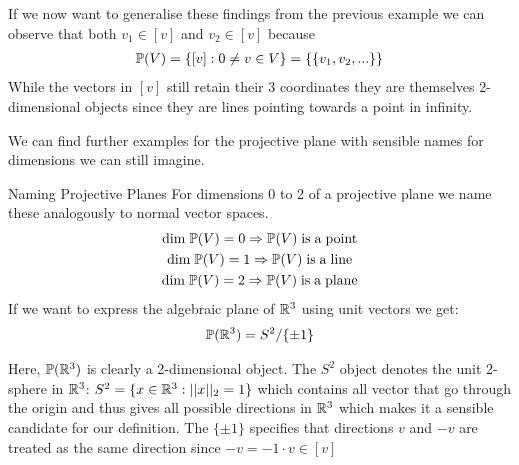 If we now want to generalise these findings from the previous example we can observe that both $v_1 \in [v]$ and $v_2 \in [v]$ because
    \begin{gather*}
        \mathbb{P}(V) = \{ [v] :  0 \neq v\in V\} = \{ \{v_1, v_2, ...\}\} 
    \end{gather*}
While the vectors in $[v]$ still retain their 3 coordinates they are themselves 2-dimensional objects since they are lines pointing towards a point in infinity.




We can find further examples for the projective plane with sensible names for dimensions we can still imagine.
\begin{exampleBox}{Naming Projective Planes}
    For dimensions 0 to 2 of a projective plane we name these analogously to normal vector spaces.
    \begin{gather*}
        \mathrm{dim} \; \mathbb{P}(V) = 0 \Rightarrow \mathbb{P}(V) \mathrm{\;is \;a\; point} \\
        \mathrm{dim} \; \mathbb{P}(V) = 1 \Rightarrow \mathbb{P}(V) \mathrm{\;is \;a\; line} \\
        \mathrm{dim} \; \mathbb{P}(V) = 2 \Rightarrow \mathbb{P}(V) \mathrm{\;is \;a\; plane} \\
    \end{gather*}
    If we want to express the algebraic plane of $\mathbb{R}^3$ using unit vectors we get:
    \begin{gather*}
        \mathbb{P}(\mathbb{R}^3) = S^2/\{\pm 1\}
    \end{gather*}
\end{exampleBox}

Here, $\mathbb{P}(\mathbb{R}^3)$ is clearly a 2-dimensional object. The $S^2$ object denotes the unit 2-sphere in $\mathbb{R}^3$: $S^2 = \{x \in \mathbb{R}^3: ||x||_2 = 1\}$ which contains all vector that go through the origin and thus gives all possible directions in $\mathbb{R}^3$ which makes it a sensible candidate for our definition. The $\{\pm 1\}$ specifies that directions $v$ and $-v$ are treated as the same direction since $-v = -1 \cdot v\in [v]$





